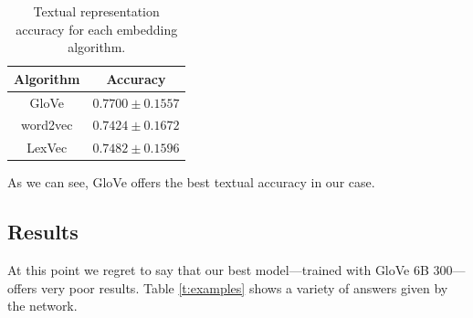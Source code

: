 \documentclass[]{article}
\begin{document}
	\begin{table}[H]
		\centering
		\begin{tabular}{@{}cc@{}}
			\toprule
			Algorithm & Accuracy            \\ \midrule
			GloVe     & $0.7700 \pm 0.1557$ \\
			word2vec  & $0.7424 \pm 0.1672$ \\
			LexVec    & $0.7482 \pm 0.1596$ \\ \bottomrule
		\end{tabular}
		\caption{Textual representation accuracy for each embedding algorithm.}
		\label{t:sources}
	\end{table}
	
	As we can see, GloVe offers the best textual accuracy in our case.
	
	\subsection{Results}
	
	At this point we regret to say that our best model---trained with GloVe 6B 300---offers very poor results. Table \ref{t:examples} shows a variety of answers given by the network.
	
\end{document}
